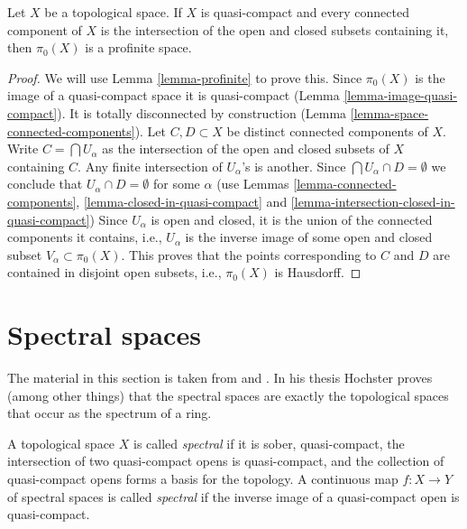 \begin{lemma}
\label{lemma-pi0-profinite}
Let $X$ be a topological space. If $X$ is quasi-compact
and every connected component of $X$ is the intersection
of the open and closed subsets containing it, then $\pi_0(X)$
is a profinite space.
\end{lemma}

\begin{proof}
We will use Lemma \ref{lemma-profinite} to prove this.
Since $\pi_0(X)$ is the image of a quasi-compact space it is
quasi-compact (Lemma \ref{lemma-image-quasi-compact}).
It is totally disconnected by construction
(Lemma \ref{lemma-space-connected-components}).
Let $C, D \subset X$ be distinct connected components of $X$.
Write $C = \bigcap U_\alpha$ as the intersection of the open and
closed subsets of $X$ containing $C$. Any finite intersection
of $U_\alpha$'s is another. Since $\bigcap U_\alpha \cap D = \emptyset$
we conclude that $U_\alpha \cap D = \emptyset$ for some $\alpha$
(use Lemmas \ref{lemma-connected-components},
\ref{lemma-closed-in-quasi-compact} and
\ref{lemma-intersection-closed-in-quasi-compact})
Since $U_\alpha$ is open and closed, it is the union of the
connected components it contains, i.e., $U_\alpha$ is the inverse
image of some open and closed subset $V_\alpha \subset \pi_0(X)$.
This proves that the points corresponding to $C$ and $D$
are contained in disjoint open subsets, i.e., $\pi_0(X)$ is
Hausdorff.
\end{proof}






\section{Spectral spaces}
\label{section-spectral}

\noindent
The material in this section is taken from \cite{Hochster} and
\cite{Hochster-thesis}. In his thesis Hochster proves (among
other things) that the spectral spaces are exactly the topological
spaces that occur as the spectrum of a ring.

\begin{definition}
\label{definition-spectral-space}
A topological space $X$ is called {\it spectral} if it is sober,
quasi-compact, the intersection of two quasi-compact opens is
quasi-compact, and the collection of quasi-compact opens forms a
basis for the topology. A continuous map $f : X \to Y$ of spectral
spaces is called {\it spectral} if the inverse image of a quasi-compact
open is quasi-compact.
\end{definition}

